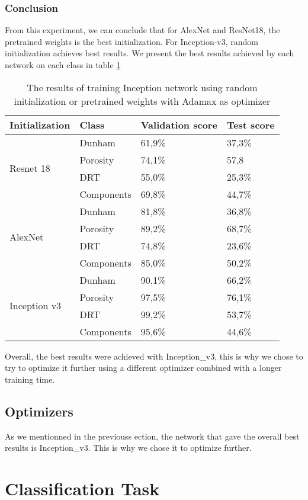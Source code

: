 \subsubsection{Conclusion}
From this experiment, we can conclude that for AlexNet and ResNet18, the pretrained weights is the best initialization. For Inception-v3, random initialization achieves best results. We present the best results achieved by each network on each class in table \ref{tab:finalinit}
\begin{table}
\caption{\label{tab:finalinit} The results of training Inception network using random initialization or pretrained weights with Adamax as optimizer}
\centering
\begin{tabular}[b]{| l | l | l | l |}
\hline
    Initialization & Class & Validation score  & Test score\\ \hline
    \multirow{4}{*}{Resnet 18} & Dunham &  61,9\%  & 37,3\% \\ 
    & Porosity & 74,1\% &  57,8\\
    &DRT & 55,0\% &  25,3\% \\
    &Components & 69,8\% &  44,7\% \\ \hline
     \multirow{4}{*}{AlexNet} & Dunham &  81,8\% & 36,8\% \\
    & Porosity & 89,2\% &  68,7\% \\
    &DRT & 74,8\% &   23,6\% \\
    &Components & 85,0\% & 50,2\% \\ \hline
    \multirow{4}{*}{Inception v3} & Dunham &  90,1\% & 66,2\% \\
    & Porosity & 97,5\% &  76,1\% \\
    &DRT & 99,2\% &  53,7\% \\
    &Components & 95,6\% & 44,6\% \\ \hline
\end{tabular} 
\end{table}
Overall, the best results were achieved with Inception\_v3, this is why we chose to try to optimize it further using a different optimizer combined with a longer training time. 

\subsection{Optimizers}
As we mentionned in the previouss ection, the network that gave the overall best results is Inception\_v3.
This is why we chose it to optimize further. 
\section{Classification Task}
